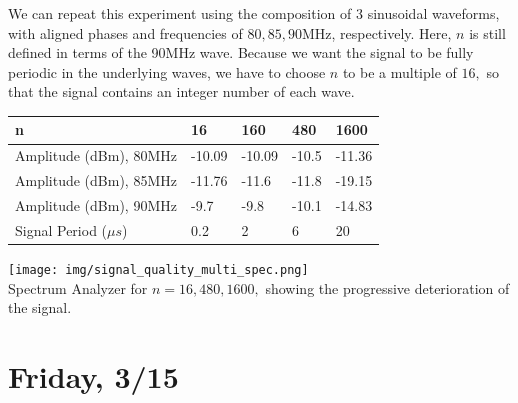 \documentclass{article}
\begin{document}
    We can repeat this experiment using the composition of 3 sinusoidal waveforms, with aligned phases and frequencies of $80,85,90$MHz, respectively. Here, $n$ is still defined in terms of the 90MHz wave. Because we want the signal to be fully periodic in the underlying waves, we have to choose $n$ to be a multiple of $16,$ so that the signal contains an integer number of each wave.
    \begin{table}[H]
    \centering
    \begin{tabular}{|l|l|l|l|l|}
    \hline
    n & 16 & 160 & 480 & 1600 \\ \hline
    Amplitude (dBm), 80MHz & -10.09 & -10.09 & -10.5 & -11.36 \\ \hline
    Amplitude (dBm), 85MHz & -11.76 & -11.6 & -11.8 & -19.15 \\ \hline
    Amplitude (dBm), 90MHz & -9.7 & -9.8 & -10.1 & -14.83 \\ \hline
    Signal Period ($\mu s$) & 0.2 & 2 & 6 & 20 \\ \hline
    \end{tabular}
    \end{table}
    \begin{mdframed}[backgroundcolor=gray!20, align = center, userdefinedwidth = 6in]
    \texttt{[image: img/signal\_quality\_multi\_spec.png]}\\
    Spectrum Analyzer for $n = 16, 480, 1600,$ showing the progressive deterioration of the signal.
    \end{mdframed}
    \section*{Friday, 3/15}
\end{document}
